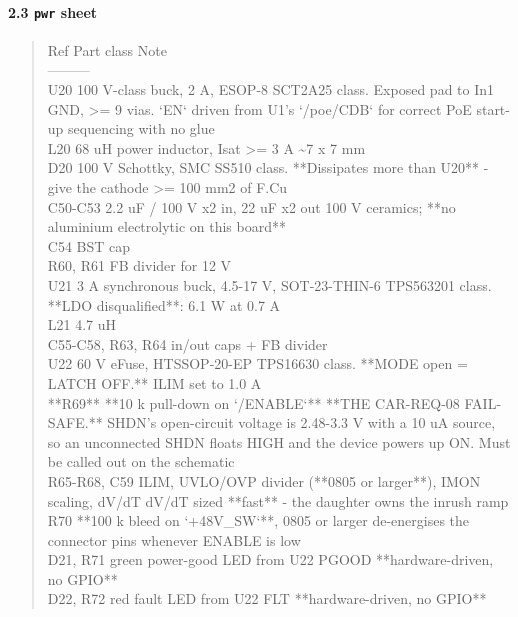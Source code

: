 \documentclass[11pt,a4paper]{article}
\begin{document}
\paragraph*{2.3 \texttt{pwr} sheet}
\begin{quote}\small\ttfamily\raggedright
\textbar{} Ref \textbar{} Part class \textbar{} Note \textbar{}\\
\textbar{}---\textbar{}---\textbar{}---\textbar{}\\
\textbar{} U20 \textbar{} 100 V-class buck, 2 A, ESOP-8 \textbar{} SCT2A25 class. Exposed pad to In1 GND, \textgreater{}= 9 vias. `EN` driven from U1's `/poe/CDB` for correct PoE start-up sequencing with no glue \textbar{}\\
\textbar{} L20 \textbar{} 68 uH power inductor, Isat \textgreater{}= 3 A \textbar{} \textasciitilde{}7 x 7 mm \textbar{}\\
\textbar{} D20 \textbar{} 100 V Schottky, SMC \textbar{} SS510 class. {*}{*}Dissipates more than U20{*}{*} - give the cathode \textgreater{}= 100 mm2 of F.Cu \textbar{}\\
\textbar{} C50-C53 \textbar{} 2.2 uF / 100 V x2 in, 22 uF x2 out \textbar{} 100 V ceramics; {*}{*}no aluminium electrolytic on this board{*}{*} \textbar{}\\
\textbar{} C54 \textbar{} BST cap \textbar{} \textbar{}\\
\textbar{} R60, R61 \textbar{} FB divider for 12 V \textbar{} \textbar{}\\
\textbar{} U21 \textbar{} 3 A synchronous buck, 4.5-17 V, SOT-23-THIN-6 \textbar{} TPS563201 class. {*}{*}LDO disqualified{*}{*}: 6.1 W at 0.7 A \textbar{}\\
\textbar{} L21 \textbar{} 4.7 uH \textbar{} \textbar{}\\
\textbar{} C55-C58, R63, R64 \textbar{} in/out caps + FB divider \textbar{} \textbar{}\\
\textbar{} U22 \textbar{} 60 V eFuse, HTSSOP-20-EP \textbar{} TPS16630 class. {*}{*}MODE open = LATCH OFF.{*}{*} ILIM set to 1.0 A \textbar{}\\
\textbar{} {*}{*}R69{*}{*} \textbar{} {*}{*}10 k pull-down on `/ENABLE`{*}{*} \textbar{} {*}{*}THE CAR-REQ-08 FAIL-SAFE.{*}{*} SHDN's open-circuit voltage is 2.48-3.3 V with a 10 uA source, so an unconnected SHDN floats HIGH and the device powers up ON. Must be called out on the schematic \textbar{}\\
\textbar{} R65-R68, C59 \textbar{} ILIM, UVLO/OVP divider ({*}{*}0805 or larger{*}{*}), IMON scaling, dV/dT \textbar{} dV/dT sized {*}{*}fast{*}{*} - the daughter owns the inrush ramp \textbar{}\\
\textbar{} R70 \textbar{} {*}{*}100 k bleed on `+48V\_SW`{*}{*}, 0805 or larger \textbar{} de-energises the connector pins whenever ENABLE is low \textbar{}\\
\textbar{} D21, R71 \textbar{} green power-good LED from U22 PGOOD \textbar{} {*}{*}hardware-driven, no GPIO{*}{*} \textbar{}\\
\textbar{} D22, R72 \textbar{} red fault LED from U22 FLT \textbar{} {*}{*}hardware-driven, no GPIO{*}{*} \textbar{}
\end{quote}
\end{document}

